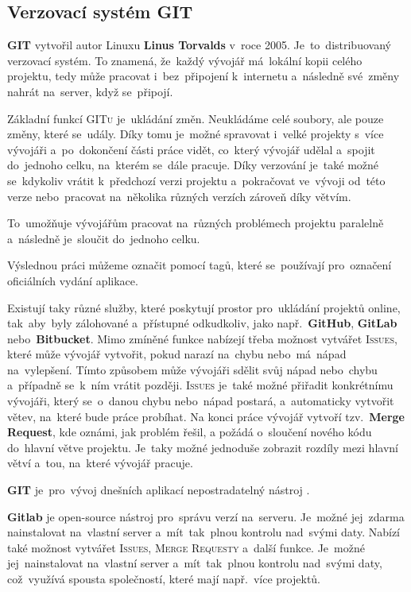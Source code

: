 \documentclass[14pt,a4paper]{article}
\begin{document}
        \subsection{Verzovací systém GIT}
        \textbf{GIT} vytvořil autor Linuxu \textbf{Linus Torvalds} v~roce 2005. Je~to~distribuovaný verzovací systém. To znamená, že~každý vývojář má~lokální kopii celého projektu, tedy může pracovat i~bez~připojení k~internetu a~následně své~změny nahrát na~server, když se~připojí.
        
        Základní funkcí \textsc{GITu} je~ukládání změn. Neukládáme celé soubory, ale pouze změny, které se~udály. Díky tomu je~možné spravovat i~velké projekty s~více vývojáři a~po~dokončení části práce vidět, co~který vývojář udělal a~spojit do~jednoho celku, na~kterém se~dále pracuje. Díky verzování je~také možné se~kdykoliv vrátit k~předchozí verzi projektu a~pokračovat ve~vývoji od~této verze nebo~pracovat na~několika různých verzích zároveň díky větvím.
        
        To~umožňuje vývojářům pracovat na~různých problémech projektu paralelně a~následně je~sloučit do~jednoho celku.

        Výslednou práci můžeme označit pomocí tagů, které se~používají pro~označení oficiálních vydání aplikace.

        Existují taky různé služby, které poskytují prostor pro~ukládání projektů online, tak~aby~byly zálohované a~přístupné odkudkoliv, jako např.~\textbf{GitHub}, \textbf{GitLab} nebo~\textbf{Bitbucket}. Mimo zmíněné funkce nabízejí třeba možnost vytvářet \textsc{Issues}, které může vývojář vytvořit, pokud narazí na~chybu nebo~má~nápad na~vylepšení. Tímto způsobem může vývojáři sdělit svůj nápad nebo~chybu a~případně se~k~ním vrátit později. \textsc{Issues} je~také možné přiřadit konkrétnímu vývojáři, který se~o~danou chybu nebo~nápad postará, a~automaticky vytvořit větev, na~které bude práce probíhat. Na konci práce vývojář vytvoří tzv.~\textbf{Merge Request}, kde oznámi, jak problém řešil, a požádá o~sloučení nového kódu do~hlavní větve projektu. Je~taky možné jednoduše zobrazit rozdíly mezi hlavní větví a~tou, na~které vývojář pracuje.
        
        \textbf{GIT} je~pro~vývoj dnešních aplikací nepostradatelný nástroj \parencite{gitscmBook}.
        
        \textbf{Gitlab} je open-source nástroj pro~správu verzí na~serveru. Je~možné jej~zdarma nainstalovat na~vlastní server a~mít~tak~plnou kontrolu nad~svými daty. Nabízí také možnost vytvářet \textsc{Issues}, \textsc{Merge Requesty} a~další funkce. Je~možné jej~nainstalovat na~vlastní server a~mít~tak~plnou kontrolu nad~svými daty, což~využívá spousta společností, které mají např.~více projektů.
\end{document}
